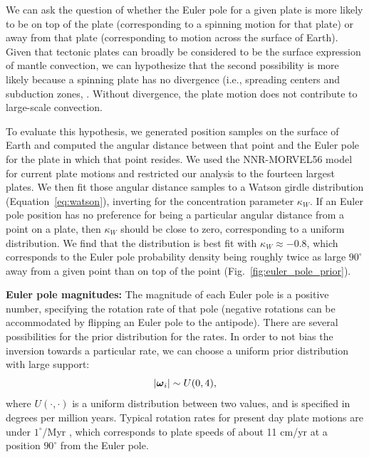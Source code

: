 \documentclass[11pt,letterpaper]{article}
\newcommand{\mitbf}[1]{\hbox{\mathversion{bold}$#1$}}
\begin{document}
We can ask the question of whether the Euler pole for a given plate is more likely to be on top of the plate (corresponding to a spinning motion for that plate) or away from that plate (corresponding to motion across the surface of Earth). Given that tectonic plates can broadly be considered to be the surface expression of mantle convection, we can hypothesize that the second possibility is more likely because a spinning plate has no divergence (i.e., spreading centers and subduction zones, \citep{Forte1987a, Gable1991a}. Without divergence, the plate motion does not contribute to large-scale convection.

To evaluate this hypothesis, we generated position samples on the surface of Earth and computed the angular distance between that point and the Euler pole for the plate in which that point resides. We used the NNR-MORVEL56 model for current plate motions \citep{Argus2011a} and restricted our analysis to the fourteen largest plates. We then fit those angular distance samples to a Watson girdle distribution (Equation~\eqref{eq:watson}),  inverting for the concentration parameter $\kappa_W$. If an Euler pole position has no preference for being a particular angular distance from a point on a plate, then $\kappa_W$ should be close to zero, corresponding to a uniform distribution. We find that the distribution is best fit with $\kappa_W \approx -0.8$, which corresponds to the Euler pole probability density being roughly twice as large $90^\circ$ away from a given point than on top of the point (Fig.~\ref{fig:euler_pole_prior}).

\textbf{Euler pole magnitudes:} 
The magnitude of each Euler pole is a positive number, specifying the rotation rate of that pole (negative rotations can be accommodated by flipping an Euler pole to the antipode). There are several possibilities for the prior distribution for the rates. In order to not bias the inversion towards a particular rate, we can choose a uniform prior distribution with large support:
\begin{equation}
\vert \mitbf{\omega}_i \vert \sim U(0, 4),
\end{equation}
where $U(\cdot, \cdot)$ is a uniform distribution between two values, and is specified  in degrees per million years. Typical rotation rates for present day plate motions are under $1^\circ$/Myr \citep{Argus2011a}, which corresponds to plate speeds of about 11 cm/yr at a position $90^\circ$ from the Euler pole.
\end{document}
